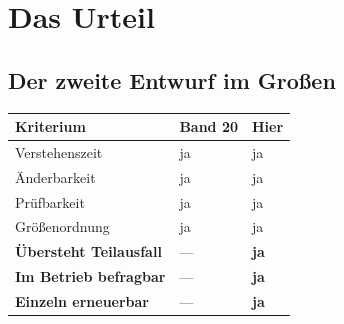 \part{Das Urteil}

\chapter{Der zweite Entwurf im Großen}\label{kap:zweiter}

\begin{merksatz}
\begin{center}
{\small
\renewcommand{\arraystretch}{1.5}
\begin{tabular}{@{}P{3.2cm}P{2.2cm}P{2.6cm}@{}}
\toprule
\textbf{Kriterium} & \textbf{Band 20} & \textbf{Hier}\\
\midrule
Verstehenszeit & \textcolor{gruen}{ja} & \textcolor{gruen}{ja}\\
Änderbarkeit & \textcolor{gruen}{ja} & \textcolor{gruen}{ja}\\
Prüfbarkeit & \textcolor{gruen}{ja} & \textcolor{gruen}{ja}\\
Größenordnung & \textcolor{gruen}{ja} & \textcolor{gruen}{ja}\\
\midrule
\textbf{Übersteht Teilausfall} & --- & \textcolor{gruen}{\textbf{ja}}\\
\textbf{Im Betrieb befragbar} & --- & \textcolor{gruen}{\textbf{ja}}\\
\textbf{Einzeln erneuerbar} & --- & \textcolor{gruen}{\textbf{ja}}\\
\bottomrule
\end{tabular}}
\end{center}

\begin{center}
\begin{minipage}{0.88\textwidth}
\end{minipage}
\end{center}
\end{merksatz}

